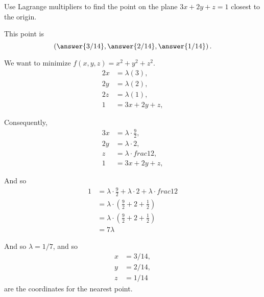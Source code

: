 \documentclass{ximera}
\author{Jim Fowler}
\begin{document}
\begin{exercise}
Use Lagrange multipliers to find the point on the plane $3x + 2y + z = 1$ closest to the origin.

This point is
\[
  \left( \answer{3/14}, \answer{2/14}, \answer{1/14} \right).
\]
  
\begin{hint}
  We want to minimize $f(x,y,z) = x^2 + y^2 + z^2$.
\begin{align*}
  2x &= \lambda( 3 ), \\
  2y &= \lambda( 2 ), \\
  2z &= \lambda( 1 ), \\
  1 &= 3x + 2y + z,
\end{align*}
\end{hint}

\begin{hint}
Consequently,
\begin{align*}
  3x &= \lambda \cdot \frac{9}{2}, \\
  2y &= \lambda \cdot 2, \\
  z &= \lambda \cdot frac{1}{2}, \\
  1 &= 3x + 2y + z,
\end{align*}
\end{hint}
\begin{hint}
And so
\begin{align*}
1
&= \lambda \cdot \frac{9}{2} + \lambda \cdot 2 + \lambda \cdot frac{1}{2} \\
&= \lambda \cdot \left( \frac{9}{2} + 2 + \frac{1}{2} \right) \\
&= \lambda \cdot \left( \frac{9}{2} + 2 + \frac{1}{2} \right) \\
&= 7 \lambda
\end{align*}
\end{hint}
\begin{hint}
And so $\lambda = 1/7$, and so
\begin{align*}
  x &= 3/14, \\
  y &= 2/14, \\
  z &= 1/14
\end{align*}
are the coordinates for the nearest point.
\end{hint}

\end{exercise}
\end{document}
